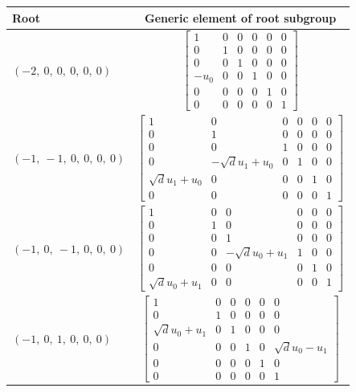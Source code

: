 \documentclass[11pt]{article}
\theoremstyle{definition}
\begin{document}
\noindent \begin{longtable}{|l|c|}
    \hline
    \textbf{Root} & \textbf{Generic element of root subgroup} \\
    \hline
    \endhead
    $\left( -2, \  0, \  0, \  0, \  0, \  0\right)$ & ${\left[\begin{matrix}1 & 0 & 0 & 0 & 0 & 0\\0 & 1 & 0 & 0 & 0 & 0\\0 & 0 & 1 & 0 & 0 & 0\\- u_{0} & 0 & 0 & 1 & 0 & 0\\0 & 0 & 0 & 0 & 1 & 0\\0 & 0 & 0 & 0 & 0 & 1\end{matrix}\right]}$ \\
    \hline
    $\left( -1, \  -1, \  0, \  0, \  0, \  0\right)$ & ${\left[\begin{matrix}1 & 0 & 0 & 0 & 0 & 0\\0 & 1 & 0 & 0 & 0 & 0\\0 & 0 & 1 & 0 & 0 & 0\\0 & - \sqrt{d} u_{1} + u_{0} & 0 & 1 & 0 & 0\\\sqrt{d} u_{1} + u_{0} & 0 & 0 & 0 & 1 & 0\\0 & 0 & 0 & 0 & 0 & 1\end{matrix}\right]}$ \\
    \hline
    $\left( -1, \  0, \  -1, \  0, \  0, \  0\right)$ & ${\left[\begin{matrix}1 & 0 & 0 & 0 & 0 & 0\\0 & 1 & 0 & 0 & 0 & 0\\0 & 0 & 1 & 0 & 0 & 0\\0 & 0 & - \sqrt{d} u_{0} + u_{1} & 1 & 0 & 0\\0 & 0 & 0 & 0 & 1 & 0\\\sqrt{d} u_{0} + u_{1} & 0 & 0 & 0 & 0 & 1\end{matrix}\right]}$ \\
    \hline
    $\left( -1, \  0, \  1, \  0, \  0, \  0\right)$ & ${\left[\begin{matrix}1 & 0 & 0 & 0 & 0 & 0\\0 & 1 & 0 & 0 & 0 & 0\\\sqrt{d} u_{0} + u_{1} & 0 & 1 & 0 & 0 & 0\\0 & 0 & 0 & 1 & 0 & \sqrt{d} u_{0} - u_{1}\\0 & 0 & 0 & 0 & 1 & 0\\0 & 0 & 0 & 0 & 0 & 1\end{matrix}\right]}$ \\

\end{longtable}
\end{document}
